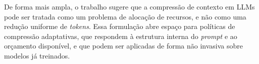 De forma mais ampla, o trabalho sugere que a compressão de contexto em LLMs pode ser tratada como um problema de alocação de recursos, e não como uma redução uniforme de \textit{tokens}. Essa formulação abre espaço para políticas de compressão adaptativas, que respondem à estrutura interna do \textit{prompt} e ao orçamento disponível, e que podem ser aplicadas de forma não invasiva sobre modelos já treinados.
